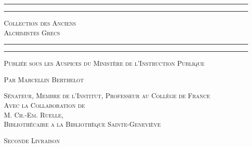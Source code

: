 \documentclass[landscape, a4paper, 11pt, oneside, polutonikogreek, french]{article}
\begin{document}
\begin{titlepage} %
	\centering %

	
    \rule{\textwidth}{1.6pt}\vspace*{-\baselineskip}\vspace*{2pt} %
	\rule{\textwidth}{0.4pt} %
	
	\vspace{0.5\baselineskip} %
	
	{\scshape\Huge Collection des Anciens \\ Alchimistes Grecs}
	
	\vspace{0.5\baselineskip} %

	\rule{\textwidth}{0.4pt}\vspace*{-\baselineskip}\vspace{3.2pt} %
	\rule{\textwidth}{1.6pt} %
	
	\vspace{0.5\baselineskip} %
	
	
	{\scshape \normalsize Publiée sous les Auspices du Ministère de l'Instruction Publique}
	
	{\scshape Par \Large Marcellin Berthelot} %
	
	\vspace*{0.5\baselineskip} %
	
        {\scshape\scriptsize Sénateur, Membre de l'Institut, Professeur au Collège de France \\Avec la Collaboration de \\\large M. Ch.-Em. Ruelle,\\\scriptsize Bibliothécaire a la Bibliothèque Sainte-Geneviève} %
  
        \vspace{\baselineskip}
  
	{\scshape \normalsize Seconde Livraison} %
  


\end{titlepage}
\end{document}
